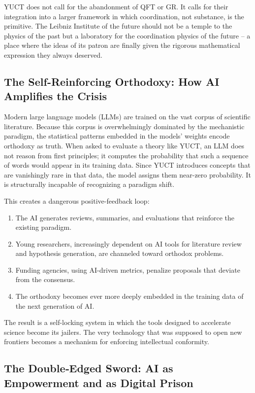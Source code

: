 \documentclass[12pt,a4paper]{article}
\begin{document}
	YUCT does not call for the abandonment of QFT or GR. It calls for their integration into a larger framework in which coordination, not substance, is the primitive. The Leibniz Institute of the future should not be a temple to the physics of the past but a laboratory for the coordination physics of the future -- a place where the ideas of its patron are finally given the rigorous mathematical expression they always deserved.
	
	\subsection{The Self-Reinforcing Orthodoxy: How AI Amplifies the Crisis}
	
	Modern large language models (LLMs) are trained on the vast corpus of scientific literature. Because this corpus is overwhelmingly dominated by the mechanistic paradigm, the statistical patterns embedded in the models' weights encode orthodoxy as truth. When asked to evaluate a theory like YUCT, an LLM does not reason from first principles; it computes the probability that such a sequence of words would appear in its training data. Since YUCT introduces concepts that are vanishingly rare in that data, the model assigns them near-zero probability. It is structurally incapable of recognizing a paradigm shift.
	
	This creates a dangerous positive-feedback loop:
	\begin{enumerate}
		\item The AI generates reviews, summaries, and evaluations that reinforce the existing paradigm.
		\item Young researchers, increasingly dependent on AI tools for literature review and hypothesis generation, are channeled toward orthodox problems.
		\item Funding agencies, using AI-driven metrics, penalize proposals that deviate from the consensus.
		\item The orthodoxy becomes ever more deeply embedded in the training data of the next generation of AI.
	\end{enumerate}
	The result is a self-locking system in which the tools designed to accelerate science become its jailers. The very technology that was supposed to open new frontiers becomes a mechanism for enforcing intellectual conformity.
	
	\subsection{The Double‑Edged Sword: AI as Empowerment and as Digital Prison}
	
\end{document}
